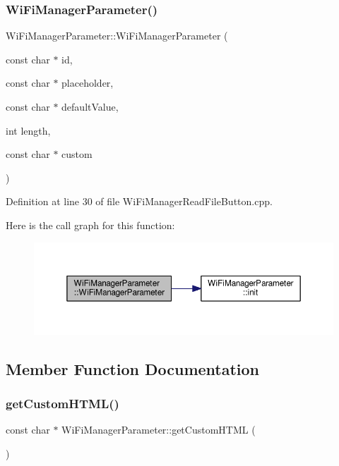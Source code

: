 \subsubsection{\texorpdfstring{Wi\+Fi\+Manager\+Parameter()}{WiFiManagerParameter()}\hspace{0.1cm}{\footnotesize\ttfamily [3/3]}}
{\footnotesize\ttfamily Wi\+Fi\+Manager\+Parameter\+::\+Wi\+Fi\+Manager\+Parameter (\begin{DoxyParamCaption}\item[{const char $\ast$}]{id,  }\item[{const char $\ast$}]{placeholder,  }\item[{const char $\ast$}]{default\+Value,  }\item[{int}]{length,  }\item[{const char $\ast$}]{custom }\end{DoxyParamCaption})}



Definition at line 30 of file Wi\+Fi\+Manager\+Read\+File\+Button.\+cpp.

Here is the call graph for this function\+:
\nopagebreak
\begin{figure}[H]
\begin{center}
\leavevmode
\includegraphics[width=350pt]{class_wi_fi_manager_parameter_a45967e1d29d52f5fc8e47e99cb693b98_cgraph}
\end{center}
\end{figure}


\subsection{Member Function Documentation}
\mbox{\label{class_wi_fi_manager_parameter_a596273c189eb40107500cee3ad31b13b}} 
\subsubsection{\texorpdfstring{get\+Custom\+H\+T\+M\+L()}{getCustomHTML()}}
{\footnotesize\ttfamily const char $\ast$ Wi\+Fi\+Manager\+Parameter\+::get\+Custom\+H\+T\+ML (\begin{DoxyParamCaption}{ }\end{DoxyParamCaption})}



